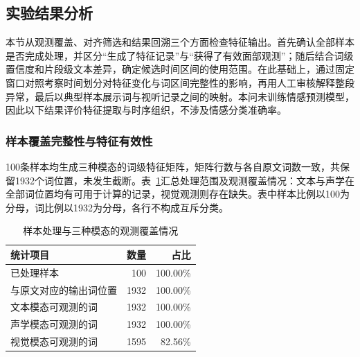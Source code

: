 \subsection{实验结果分析}
\label{sec:p1_results}

本节从观测覆盖、对齐筛选和结果回溯三个方面检查特征输出。首先确认全部样本是否完成处理，并区分“生成了特征记录”与“获得了有效面部观测”；随后结合词级置信度和片段级文本差异，确定候选时间区间的使用范围。在此基础上，通过固定窗口对照考察时间划分对特征变化与词区间完整性的影响，再用人工审核解释整段异常，最后以典型样本展示词与视听记录之间的映射。本问未训练情感预测模型，因此以下结果评价特征提取与时序组织，不涉及情感分类准确率。

\subsubsection{样本覆盖完整性与特征有效性}
\label{sec:p1_quality_scope}

100条样本均生成三种模态的词级特征矩阵，矩阵行数与各自原文词数一致，共保留1932个词位置，未发生截断。表~\ref{tab:p1_result_overview}汇总处理范围及观测覆盖情况：文本与声学在全部词位置均有可用于计算的记录，视觉观测则存在缺失。表中样本比例以100为分母，词比例以1932为分母，各行不构成互斥分类。

\begin{table}[H]
    \centering\small
    \caption{样本处理与三种模态的观测覆盖情况}
    \label{tab:p1_result_overview}
    \setlength{\tabcolsep}{6pt}
    \renewcommand{\arraystretch}{1.12}
    \ifdefined\pOneCompactTableBox\else\newsavebox{\pOneCompactTableBox}\fi
    \begin{lrbox}{\pOneCompactTableBox}
    \begin{tabular}{lrr}
        \toprule
        统计项目 & 数量 & 占比\\
        \midrule
        已处理样本 & 100 & 100.00\%\\
        与原文对应的输出词位置 & 1932 & 100.00\%\\
        文本模态可观测的词 & 1932 & 100.00\%\\
        声学模态可观测的词 & 1932 & 100.00\%\\
        视觉模态可观测的词 & 1595 & 82.56\%\\
        \bottomrule
    \end{tabular}
    \end{lrbox}
    \usebox{\pOneCompactTableBox}
\par\smallskip
\end{table}

